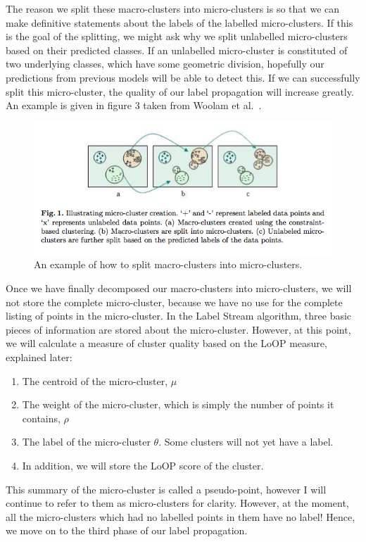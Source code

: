 \documentclass[12pt,a4paper,oneside]{report}
\begin{document}
The reason we split these macro-clusters into micro-clusters is so that we can make definitive statements about the labels of the labelled micro-clusters. If this is the goal of the splitting, we might ask why we split unlabelled micro-clusters based on their predicted classes. If an unlabelled micro-cluster is constituted of two underlying classes, which have some geometric division, hopefully our predictions from previous models will be able to detect this. If we can successfully split this micro-cluster, the quality of our label propagation will increase greatly. An example is given in figure 3 taken from Woolam et al.~\cite{LabStr}.
\begin{figure}
	\includegraphics[scale = 0.7]{ClusterSplitting}
	\caption{An example of how to split macro-clusters into micro-clusters.}
\end{figure}
Once we have finally decomposed our macro-clusters into micro-clusters, we will not store the complete micro-cluster, because we have no use for the complete listing of points in the micro-cluster. In the Label Stream algorithm, three basic pieces of information are stored about the micro-cluster. However, at this point, we will calculate a measure of cluster quality based on the LoOP measure, explained later:
\begin{enumerate}
\item The centroid of the micro-cluster, \(\mu\)
\item The weight of the micro-cluster, which is simply the number of points it contains, \(\rho\)
\item The label of the micro-cluster $\theta$. Some clusters will not yet have a label.
\item In addition, we will store the LoOP score of the cluster.
\end{enumerate}

This summary of the micro-cluster is called a pseudo-point, however I will continue to refer to them as micro-clusters for clarity. However, at the moment, all the micro-clusters which had no labelled points in them have no label! Hence, we move on to the third phase of our label propagation. 
\end{document}
